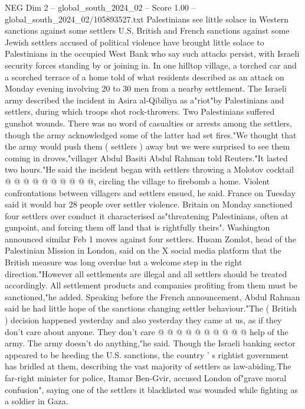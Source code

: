 \begin{textsample}{NEG Dim 2 – global\_south\_2024\_02 – Score 1.00 – global\_south\_2024\_02/105893527.txt}  \label{ex:f2_neg_418}
Palestinians see little solace in Western sanctions against some settlers U.S, British and French sanctions against some Jewish settlers accused of political violence have brought little solace to Palestinians in the occupied West Bank who say such attacks persist, with Israeli security forces standing by or joining in.
In one hilltop village, a torched car and a scorched terrace of a home told of what residents described as an attack on Monday evening involving 20 to 30 men from a nearby settlement.
The Israeli army described the incident in Asira al-Qibiliya as a"riot"by Palestinians and settlers, during which troops shot rock-throwers.
Two Palestinians suffered gunshot wounds.
There was no word of casualties or arrests among the settlers, though the army acknowledged some of the latter had set fires."We thought that the army would push them ( settlers ) away but we were surprised to see them coming in droves,"villager Abdul Basiti Abdul Rahman told Reuters."It lasted two hours."He said the incident began with settlers throwing a Molotov cocktail @ @ @ @ @ @ @ @ @ @, circling the village to firebomb a home.
Violent confrontations between villagers and settlers ensued, he said.
France on Tuesday said it would bar 28 people over settler violence.
Britain on Monday sanctioned four settlers over conduct it characterised as"threatening Palestinians, often at gunpoint, and forcing them off land that is rightfully theirs".
Washington announced similar Feb 1 moves against four settlers.
Husam Zomlot, head of the Palestinian Mission in London, said on the X social media platform that the British measure was long overdue but a welcome step in the right direction."However all settlements are illegal and all settlers should be treated accordingly.
All settlement products and companies profiting from them must be sanctioned,"he added.
Speaking before the French announcement, Abdul Rahman said he had little hope of the sanctions changing settler behaviour."The ( British ) decision happened yesterday and also yesterday they came at us, as if they don't care about anyone.
They don't care @ @ @ @ @ @ @ @ @ @ help of the army.
The army doesn't do anything,"he said.
Though the Israeli banking sector appeared to be heeding the U.S. sanctions, the country ' s rightist government has bridled at them, describing the vast majority of settlers as law-abiding.The far-right minister for police, Itamar Ben-Gvir, accused London of"grave moral confusion", saying one of the settlers it blacklisted was wounded while fighting as a soldier in Gaza.

\end{textsample}
